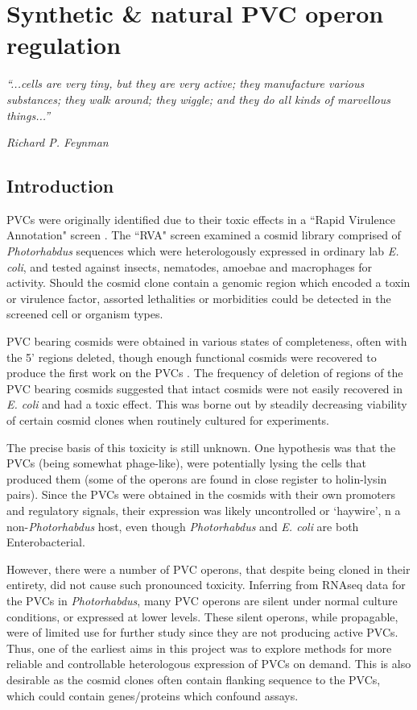 \pagestyle{IHA-fancy-style}


\chapter{Synthetic \& natural PVC operon regulation}\label{regulation}

\epigraph{\emph{``...cells are very tiny, but they are very active; they manufacture various substances; they walk around; they wiggle; and they do all kinds of marvellous things...''}}{\textit{Richard P. Feynman}}

\section{Introduction}
PVCs were originally identified due to their toxic effects in a ``Rapid Virulence Annotation" screen \citep{Waterfield2008, Yang2006}. The ``RVA" screen examined a cosmid library comprised of \emph{Photorhabdus} sequences which were heterologously expressed in ordinary lab \emph{E. coli},  and tested against insects, nematodes, amoebae and macrophages for activity. Should the cosmid clone contain a genomic region which encoded a toxin or virulence factor, assorted lethalities or morbidities could be detected in the screened cell or organism types.

PVC bearing cosmids were obtained in various states of completeness, often with the 5' regions deleted, though enough functional cosmids were recovered to produce the first work on the PVCs \citep{Yang2006}. The frequency of deletion of regions of the PVC bearing cosmids suggested that intact cosmids were not easily recovered in \emph{E. coli} and had a toxic effect. This was borne out by steadily decreasing viability of certain cosmid clones when routinely cultured for experiments.

The precise basis of this toxicity is still unknown. One hypothesis was that the PVCs (being somewhat phage-like), were potentially lysing the cells that produced them (some of the operons are found in close register to holin-lysin pairs). Since the PVCs were obtained in the cosmids with their own promoters and regulatory signals, their expression was likely uncontrolled or `haywire', n a non-\emph{Photorhabdus} host, even though \emph{Photorhabdus} and \emph{E. coli} are both Enterobacterial.

However, there were a number of PVC operons, that despite being cloned in their entirety, did not cause such pronounced toxicity. Inferring from RNAseq data for the PVCs in \emph{Photorhabdus}, many PVC operons are silent under normal culture conditions, or expressed at lower levels. These silent operons, while propagable, were of limited use for further study since they are not producing active PVCs. Thus, one of the earliest aims in this project was to explore methods for more reliable and controllable heterologous expression of PVCs on demand. This is also desirable as the cosmid clones often contain flanking sequence to the PVCs, which could contain genes/proteins which confound assays.

